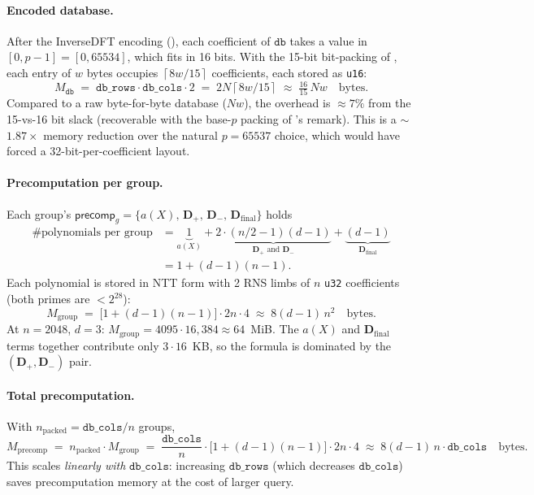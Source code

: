 \documentclass[11pt,a4paper]{article}
\newcommand{\ceil}[1]{\left\lceil #1 \right\rceil}
\begin{document}
\paragraph{Encoded database.}
After the InverseDFT encoding (), each coefficient of $\texttt{db}$ takes a value in $[0, p\!-\!1] = [0, 65534]$, which fits in 16 bits.
With the 15-bit bit-packing of , each entry of $w$ bytes occupies $\ceil{8w/15}$ coefficients, each stored as \texttt{u16}:
\begin{equation}
M_{\texttt{db}} \;=\; \texttt{db\_rows} \cdot \texttt{db\_cols} \cdot 2 \;=\; 2 N \ceil{8w/15} \;\approx\; \tfrac{16}{15}\, N w \quad \text{bytes}.
\label{eq:mem-db}
\end{equation}
Compared to a raw byte-for-byte database ($Nw$), the overhead is $\approx 7\%$ from the 15-vs-16 bit slack (recoverable with the base-$p$ packing of 's remark).
This is a $\sim$$1.87\times$ memory reduction over the natural $p = 65537$ choice, which would have forced a 32-bit-per-coefficient layout.

\paragraph{Precomputation per group.}
Each group's $\mathsf{precomp}_g = \{a(X),\, \mathbf{D}_+,\, \mathbf{D}_-,\, \mathbf{D}_{\mathrm{final}}\}$ holds
\begin{align*}
\#\text{polynomials per group} &= \underbrace{1}_{a(X)} + \underbrace{2 \cdot (n/2 - 1)(d-1)}_{\mathbf{D}_+ \text{ and } \mathbf{D}_-} + \underbrace{(d-1)}_{\mathbf{D}_{\mathrm{final}}} \\
&= 1 + (d-1)(n-1).
\end{align*}
Each polynomial is stored in NTT form with 2 RNS limbs of $n$ \texttt{u32} coefficients (both primes are $< 2^{28}$):
\begin{equation}
M_{\mathrm{group}} \;=\; \bigl[1 + (d\!-\!1)(n\!-\!1)\bigr] \cdot 2n \cdot 4 \;\approx\; 8(d\!-\!1)\, n^2 \quad \text{bytes}.
\label{eq:mem-group}
\end{equation}
At $n = 2048$, $d = 3$: $M_{\mathrm{group}} = 4095 \cdot 16{,}384 \approx 64$~MiB.
The $a(X)$ and $\mathbf{D}_{\mathrm{final}}$ terms together contribute only $3 \cdot 16$~KB, so the formula is dominated by the $(\mathbf{D}_+, \mathbf{D}_-)$ pair.

\paragraph{Total precomputation.}
With $n_{\mathrm{packed}} = \texttt{db\_cols}/n$ groups,
\begin{equation}
M_{\mathrm{precomp}} \;=\; n_{\mathrm{packed}} \cdot M_{\mathrm{group}} \;=\; \frac{\texttt{db\_cols}}{n} \cdot \bigl[1 + (d\!-\!1)(n\!-\!1)\bigr] \cdot 2n \cdot 4 \;\approx\; 8(d\!-\!1)\, n \cdot \texttt{db\_cols} \quad \text{bytes}.
\label{eq:mem-precomp}
\end{equation}
This scales \emph{linearly with} $\texttt{db\_cols}$: increasing $\texttt{db\_rows}$ (which decreases $\texttt{db\_cols}$) saves precomputation memory at the cost of larger query.
\end{document}
